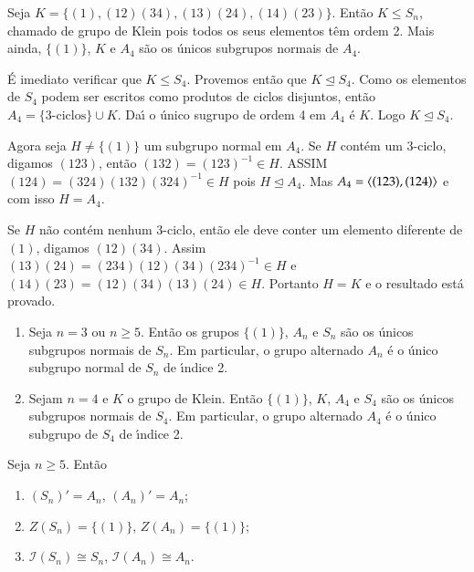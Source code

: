 \begin{teorema}
	Seja $K = \{(1), (12)(34), (13)(24), (14)(23)\}$. Ent\~ao $K \le S_n$, chamado de grupo de Klein pois todos os seus elementos t\^em ordem 2. Mais ainda, $\{(1)\}$, $K$ e $A_4$ s\~ao os \'unicos subgrupos normais de $A_4$.
\end{teorema}
\begin{prova}
	\'E imediato verificar que $K \le S_4$. Provemos ent\~ao que $K \unlhd S_4$. Como os elementos de $S_4$ podem ser escritos como produtos de ciclos disjuntos, ent\~ao $A_4 = \{3\mbox{-ciclos}\} \cup K$. Da{\'\i} o \'unico sugrupo de ordem 4 em $A_4$ \'e $K$. Logo $K \unlhd S_4$.

	Agora seja $H \ne \{(1)\}$ um subgrupo normal em $A_4$. Se $H$ cont\'em um 3-ciclo, digamos $(1 2 3)$, ent\~ao $(1 3 2) = (1 2 3)^{-1} \in H$. ASSIM $(1 2 4) = (3 2 4)(1 3 2)(3 2 4)^{-1} \in H$ pois $H \unlhd A_4$. Mas $A_4 = \langle{(1 2 3), (1 2 4)}\rangle$ e com isso $H = A_4$.

	Se $H$ n\~ao cont\'em nenhum 3-ciclo, ent\~ao ele deve conter um elemento diferente de $(1)$, digamos $(1 2)(3 4)$. Assim $(1 3)(2 4) = (2 3 4)(1 2)(3 4)(2 3 4)^{-1} \in H$ e $(1 4)(2 3) = (1 2)(3 4)(1 3)(2 4) \in H$. Portanto $H = K$ e o resultado est\'a provado.
\end{prova}

\begin{corolario}
	\begin{enumerate}[label=({\roman*})]
		\item Seja $n = 3$ ou $n \ge 5$. Ent\~ao os grupos $\{(1)\}$, $A_n$ e $S_n$ s\~ao os \'unicos subgrupos normais de $S_n$. Em particular, o grupo alternado $A_n$ \'e o \'unico subgrupo normal de $S_n$ de {\'\i}ndice 2.

		\item Sejam $n = 4$ e $K$ o grupo de Klein. Ent\~ao $\{(1)\}$, $K$, $A_4$ e $S_4$ s\~ao os \'unicos subgrupos normais de $S_4$. Em particular, o grupo alternado $A_4$ \'e o \'unico subgrupo de $S_4$ de {\'\i}ndice 2.
	\end{enumerate}
\end{corolario}

\begin{corolario}
	Seja $n \ge 5$. Ent\~ao
	\begin{enumerate}[label=({\roman*})]
		\item $(S_n)' = A_n$, $(A_n)' = A_n$;

		\item $Z(S_n) = \{(1)\}$, $Z(A_n) = \{(1)\}$;

		\item $\mathcal{I}(S_n) \cong S_n$, $\mathcal{I}(A_n) \cong A_n$.
	\end{enumerate}
\end{corolario}

